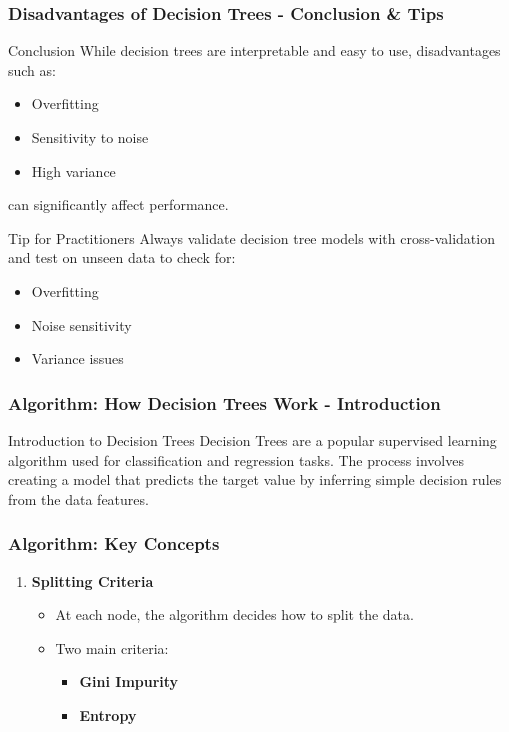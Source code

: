 \documentclass[aspectratio=169]{beamer}
\begin{document}
\begin{frame}[fragile]
    \frametitle{Disadvantages of Decision Trees - Conclusion & Tips}
    \begin{block}{Conclusion}
        While decision trees are interpretable and easy to use, disadvantages such as:
        \begin{itemize}
            \item Overfitting
            \item Sensitivity to noise
            \item High variance
        \end{itemize}
        can significantly affect performance.
    \end{block}

    \begin{block}{Tip for Practitioners}
        Always validate decision tree models with cross-validation and test on unseen data to check for:
        \begin{itemize}
            \item Overfitting
            \item Noise sensitivity
            \item Variance issues
        \end{itemize}
    \end{block}
\end{frame}

\begin{frame}[fragile]
    \frametitle{Algorithm: How Decision Trees Work - Introduction}
    \begin{block}{Introduction to Decision Trees}
        Decision Trees are a popular supervised learning algorithm used for classification and regression tasks. The process involves creating a model that predicts the target value by inferring simple decision rules from the data features.
    \end{block}
\end{frame}

\begin{frame}[fragile]
    \frametitle{Algorithm: Key Concepts}
    \begin{enumerate}
        \item \textbf{Splitting Criteria}
        \begin{itemize}
            \item At each node, the algorithm decides how to split the data.
            \item Two main criteria:
            \begin{itemize}
                \item \textbf{Gini Impurity}
                \item \textbf{Entropy}
            \end{itemize}
        \end{itemize}
    \end{enumerate}
\end{frame}
\end{document}
